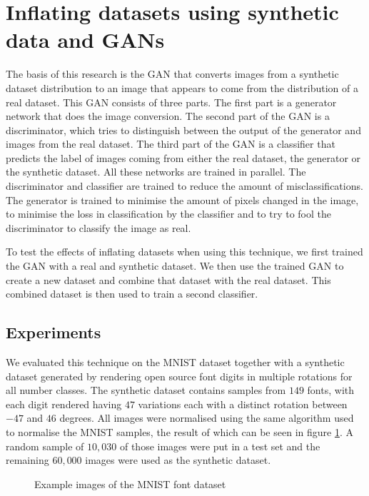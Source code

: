 \documentclass[10pt,twocolumn,letterpaper]{article}
\begin{document}

\section{Inflating datasets using synthetic data and GANs}

The basis of this research is the GAN that converts images from a synthetic dataset distribution to an image that appears to come from the distribution of a real dataset. This GAN consists of three parts. The first part is a generator network that does the image conversion. The second part of the GAN is a discriminator, which tries to distinguish between the output of the generator and images from the real dataset. The third part of the GAN is a classifier that predicts the label of images coming from either the real dataset, the generator or the synthetic dataset. All these networks are trained in parallel. The discriminator and classifier are trained to reduce the amount of misclassifications. The generator is trained to minimise the amount of pixels changed in the image, to minimise the loss in classification by the classifier and to try to fool the discriminator to classify the image as real.

To test the effects of inflating datasets when using this technique, we first trained the GAN with a real and synthetic dataset. We then use the trained GAN to create a new dataset and combine that dataset with the real dataset. This combined dataset is then used to train a second classifier.

\subsection{Experiments}


We evaluated this technique on the MNIST dataset \cite{mnist} together with a synthetic dataset generated by rendering open source font digits in multiple rotations for all number classes.
The synthetic dataset contains samples from $149$ fonts, with each digit rendered having $47$ variations each with a distinct rotation between $-47$ and $46$ degrees. All images were normalised using the same algorithm used to normalise the MNIST samples, the result of which can be seen in figure \ref{fig:example-font-images}. A random sample of $10,030$ of those images were put in a test set and the remaining $60,000$ images were used as the synthetic dataset.

\begin{figure}[t]
\begin{center}
\end{center}
   \caption{Example images of the MNIST font dataset}
\label{fig:example-font-images}
\end{figure}
\end{document}
